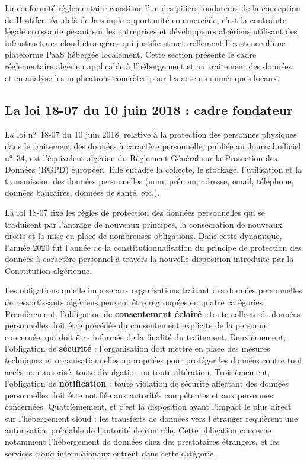 La conformité réglementaire constitue l'un des piliers fondateurs de la conception de Hostifer. Au-delà de la simple opportunité commerciale, c'est la contrainte légale croissante pesant sur les entreprises et développeurs algériens utilisant des infrastructures cloud étrangères qui justifie structurellement l'existence d'une plateforme PaaS hébergée localement. Cette section présente le cadre réglementaire algérien applicable à l'hébergement et au traitement des données, et en analyse les implications concrètes pour les acteurs numériques locaux.

\subsection*{La loi 18-07 du 10 juin 2018 : cadre fondateur}

La loi n°~18-07 du 10 juin 2018, relative à la protection des personnes physiques dans le traitement des données à caractère personnelle, publiée au Journal officiel n°~34, est l'équivalent algérien du Règlement Général sur la Protection des Données (RGPD) européen. Elle encadre la collecte, le stockage, l'utilisation et la transmission des données personnelles (nom, prénom, adresse, email, téléphone, données bancaires, données de santé, etc.). 

La loi 18-07 fixe les règles de protection des données personnelles qui se traduisent par l'ancrage de nouveaux principes, la consécration de nouveaux droits et la mise en place de nombreuses obligations. Dans cette dynamique, l'année 2020 fut l'année de la constitutionnalisation du principe de protection des données à caractère personnel à travers la nouvelle disposition introduite par la Constitution algérienne. 

Les obligations qu'elle impose aux organisations traitant des données personnelles de ressortissants algériens peuvent être regroupées en quatre catégories. Premièrement, l'obligation de \textbf{consentement éclairé} : toute collecte de données personnelles doit être précédée du consentement explicite de la personne concernée, qui doit être informée de la finalité du traitement. Deuxièmement, l'obligation de \textbf{sécurité} : l'organisation doit mettre en place des mesures techniques et organisationnelles appropriées pour protéger les données contre tout accès non autorisé, toute divulgation ou toute altération. Troisièmement, l'obligation de \textbf{notification} : toute violation de sécurité affectant des données personnelles doit être notifiée aux autorités compétentes et aux personnes concernées. Quatrièmement, et c'est la disposition ayant l'impact le plus direct sur l'hébergement cloud : les transferts de données vers l'étranger requièrent une autorisation préalable de l'autorité de contrôle. Cette obligation concerne notamment l'hébergement de données chez des prestataires étrangers, et les services cloud internationaux entrent dans cette catégorie. 

